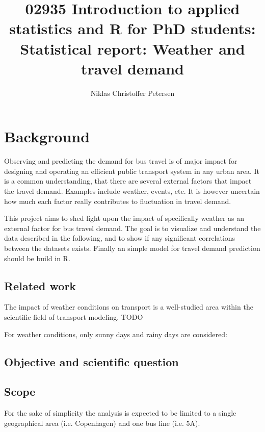 \documentclass[a4paper,11pt]{article}
\title{{\small 02935 Introduction to applied statistics and R for PhD students: }\\[1em]Statistical report: Weather and travel demand}
\author{Niklas Christoffer Petersen}
\affil{Transport Modelling, Department of Management Engineering \\ Technical University of Denmark, 2800 Kongens Lyngby, Denmark}
\begin{document}
\singlespace
\maketitle
\thispagestyle{empty}
\clearpage

\onehalfspacing
{}
\tableofcontents
\clearpage
\glsaddall
\printglossaries


\clearpage

\section{Background}\label{ch:background}

Observing and predicting the demand for bus travel is of major impact for designing and operating an efficient public transport system in any urban area. It is a common understanding, that there are several external factors that impact the travel demand. Examples include weather, events, etc. It is however uncertain how much each factor really contributes to fluctuation in travel demand. 

This project aims to shed light upon the impact of specifically weather as an external factor for bus travel demand. The goal is to visualize and understand the data described in the following, and to show if any significant correlations between the datasets exists. Finally an simple model for travel demand prediction should be build in R.

\subsection{Related work}\label{ch:relatedWork}
The impact of weather conditions on transport is a well-studied area within the scientific field of transport modeling.
TODO

For weather conditions, only sunny days and rainy days are considered: \citet{Yo2010}




\subsection{Objective and scientific question}\label{ch:objective}

\subsection{Scope}\label{ch:scope}
For the sake of simplicity the analysis is expected to be limited to a single geographical area (i.e. Copenhagen) and one bus line (i.e. 5A). 
\end{document}
